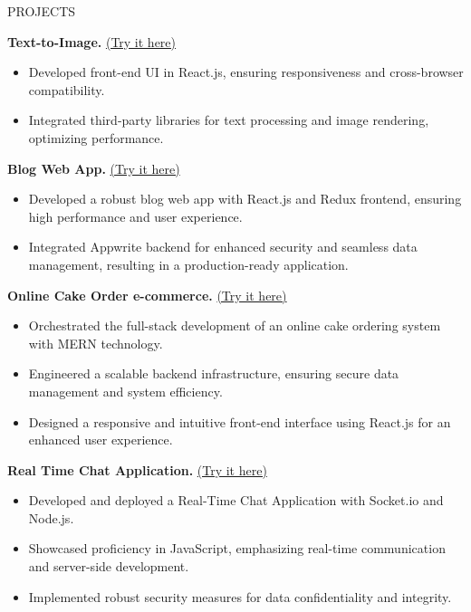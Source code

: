 \documentclass{resume} %
\begin{document}
\begin{rSection}{PROJECTS}
\vspace{-1.25em}
\item \textbf{Text-to-Image.} \href{https://hiring-search.careerflow.ai/}{(Try it here)}
{\begin{itemize}
    \itemsep -3pt {} 
     \item Developed front-end UI in React.js, ensuring responsiveness and cross-browser compatibility.
     \item Integrated third-party libraries for text processing and image rendering, optimizing performance.
 \end{itemize}
 }
\item \textbf{Blog Web App.} \href{https://hiring-search.careerflow.ai/}{(Try it here)}
{\begin{itemize}
    \itemsep -3pt {} 
     \item Developed a robust blog web app with React.js and Redux frontend, ensuring high performance and user experience.
     \item Integrated Appwrite backend for enhanced security and seamless data management, resulting in a production-ready application.
 \end{itemize}
 }
 \item \textbf{Online Cake Order e-commerce.} \href{https://hiring-search.careerflow.ai/}{(Try it here)}
{\begin{itemize}
    \itemsep -3pt {} 
     \item Orchestrated the full-stack development of an online cake ordering system with MERN technology.
     \item Engineered a scalable backend infrastructure, ensuring secure data management and system efficiency.
     \item Designed a responsive and intuitive front-end interface using React.js for an enhanced user experience.
 \end{itemize}
 }
 \item \textbf{Real Time Chat Application.} \href{https://hiring-search.careerflow.ai/}{(Try it here)}
{\begin{itemize}
    \itemsep -3pt {} 
     \item Developed and deployed a Real-Time Chat Application with Socket.io and Node.js.
     \item Showcased proficiency in JavaScript, emphasizing real-time communication and server-side development.
     \item Implemented robust security measures for data confidentiality and integrity.
 \end{itemize}
 }
\end{rSection} 
\end{document}
